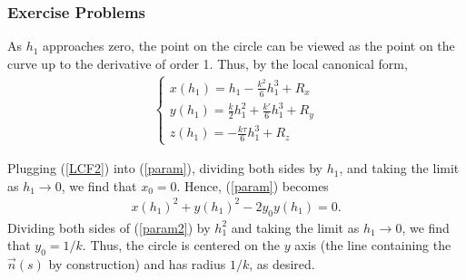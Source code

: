 \documentclass[handout]{beamer}
\theoremstyle{definition}
\theoremstyle{remark}
\renewcommand{\=}{&=&}
\newcommand{\<}{\langle}
\renewcommand{\>}{\rangle}
\begin{document}
\begin{frame}[t]
\frametitle{Exercise Problems}
\begin{solution}
As $h_1$ approaches zero, the point on the circle can be viewed as the point on the curve up to
the derivative of order 1. Thus, by the local canonical form,
\begin{align}
\label{LCF2}
\begin{cases}
x(h_1) = h_1 - \frac{k^2}{6}h_1^3 + R_x \\
y(h_1) = \frac{k}{2} h_1^2 + \frac{k'}{6} h_1^3 + R_y \\
z(h_1) = -\frac{k \tau}{6} h_1^3 + R_z
\end{cases}
\end{align}
\pause

Plugging (\ref{LCF2}) into (\ref{param}), dividing both sides by $h_1$, and taking the limit as $h_1
\to 0$, we find that $x_0 = 0$. Hence, (\ref{param}) becomes
\begin{align} \label{param2}
x(h_1)^2 + y(h_1)^2 - 2y_0y(h_1) = 0.
\end{align}
\pause
Dividing both sides of (\ref{param2}) by $h_1^2$ and taking the limit as $h_1 \to 0$, we find that
$y_0 = 1/k$. Thus, the circle is centered on the $y$ axis (the line containing the $\vec n(s)$ by
construction) and has radius $1/k$, as desired.
\end{solution}
\end{frame}

\begin{frame}[t]
\frametitle{}

\end{frame}

\end{document}
